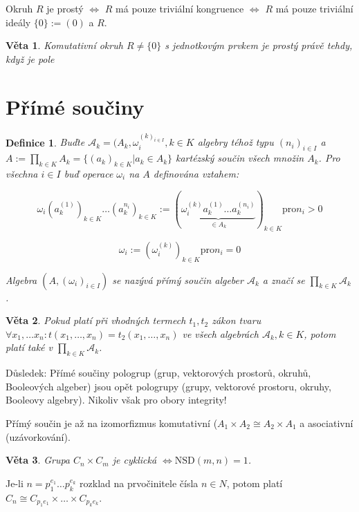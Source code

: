 \documentclass[a4paper, 11pt]{report}
\newtheorem{mydef}{Definice}[chapter]
\newtheorem{veta}{Věta}
\begin{document}
Okruh $R$ je prostý $\Leftrightarrow$ $R$ má pouze triviální kongruence $\Leftrightarrow$ $R$ má pouze triviální ideály $\{0\} := (0)$ a $R$.

\begin{veta}
Komutativní okruh $R \not= \{0\}$ s jednotkovým prvkem je prostý právě tehdy, když je pole
\end{veta}

\section{Přímé součiny}

\begin{mydef}
Buďte $\mathcal{A}_k = (A_k, \omega_i^{(k)_{i \in I}}, k \in K$ algebry téhož typu $(n_i)_{i \in I}$ a $A := \prod\limits_{k \in K} A_k = \{(a_k)_{k \in K} | a_k \in A_k\}$ kartézský součin všech množin $A_k$. Pro všechna $i \in I$ buď operace $\omega_i$ na $A$ definována vztahem:

$$ \omega_i(a_k^{(1)})_{k \in K} \dots (a_k^{n_i})_{k \in K} := (\underbrace{\omega_i^{(k)}a_k^{(1)} \dots a_k^{(n_i)}}_{\in A_k})_{k \in K} \text{pro} n_i > 0 $$

$$ \omega_i := (\omega_i^{(k)})_{k \in K} \text{pro} n_i = 0 $$

Algebra $(A, (\omega_i)_{i \in I})$ se nazývá přímý součin algeber $\mathcal{A}_k$ a značí se $\prod\limits_{k \in K} \mathcal{A}_k$.
\end{mydef}

\begin{veta}
Pokud platí při vhodných termech $t_1, t_2$ zákon tvaru $\forall x_1, \dots x_n : t(x_1, \dots, x_n) = t_2(x_1, \dots, x_n)$ ve všech algebrách $\mathcal{A}_k, k \in K$, potom platí také v $\prod\limits_{k \in K}\mathcal{A}_k$.
\end{veta}

Důsledek: Přímé součiny pologrup (grup, vektorových prostorů, okruhů, Booleových algeber) jsou opět pologrupy (grupy, vektorové prostoru, okruhy, Booleovy algebry). Nikoliv však pro obory integrity!

Přímý součin je až na izomorfizmus komutativní ($A_1 \times A_2 \cong A_2 \times A_1$ a asociativní (uzávorkování).

\begin{veta}
Grupa $C_n \times C_m$ je cyklická $\Leftrightarrow \text{NSD}(m, n) = 1$.
\end{veta}

Je-li $n = p_1^{e_1} \dots p_k^{e_k}$ rozklad na prvočinitele čísla $n \in N$, potom platí $C_n \cong C_{p_1{e_1}} \times \dots \times C_{p_k{e_k}}$.
\end{document}
